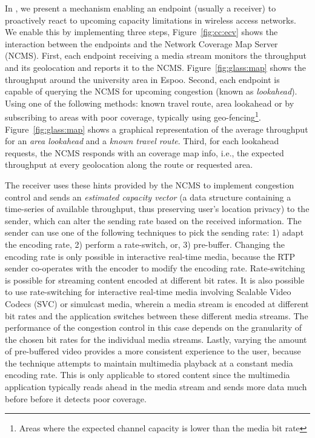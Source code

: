 In , we present a mechanism enabling an endpoint (usually a
receiver) to proactively react to upcoming capacity limitations in wireless
access networks. We enable this by implementing three steps,
Figure~\ref{fig:cc:ecv} shows the interaction between the endpoints and the
Network Coverage Map Server (NCMS). First, each endpoint receiving a media
stream monitors the throughput and its geolocation and reports it to the NCMS.
Figure~\ref{fig:glass:map} shows the throughput around the university area in
Espoo. Second, each endpoint is capable of querying the NCMS for upcoming
congestion (known as \emph{lookahead}). Using one of
the following methods: known travel route, area lookahead or by subscribing to
areas with poor coverage, typically using geo-fencing\footnote{Areas where the
expected channel capacity is lower than the media bit rate}.
Figure~\ref{fig:glass:map} shows a graphical representation of the average
throughput for an \emph{area lookahead} and a \emph{known travel route}. Third,
for each lookahead requests, the NCMS responds with an coverage map info,
i.e., the expected throughput at every geolocation along the route or
requested area.


The receiver uses these hints provided by the NCMS to implement congestion
control and sends an \emph{estimated capacity vector} (a data structure
containing a time-series of available throughput, thus preserving user's
location privacy) to the sender, which can alter the sending rate based on the
received information. The sender can use one of the following techniques to pick the
sending rate: 1) adapt the encoding rate, 2) perform a rate-switch, or, 3)
pre-buffer. Changing the encoding rate is only possible in interactive 
real-time media, because the RTP sender co-operates with the encoder to  modify the
encoding rate. Rate-switching is possible for streaming content  encoded at
different bit rates. It is also possible to use rate-switching  for
interactive real-time media involving Scalable Video Codecs (SVC) or simulcast
media, wherein a media stream is encoded at different bit rates and the
application switches between these different media streams. The performance of the
congestion control in this case depends on the granularity of the chosen bit
rates for the individual media streams. Lastly, varying the amount of 
pre-buffered video provides a more consistent experience to the user,  because the
technique attempts to maintain multimedia playback at a constant media
encoding rate. This is only applicable to stored content since the multimedia 
application typically reads ahead in the media stream and sends more data 
much before before it detects poor coverage.

